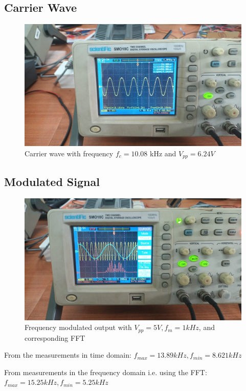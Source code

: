 \documentclass{article}
\begin{document}
\subsection{Carrier Wave}
\begin{figure}[!ht]
\includegraphics[width=\textwidth]{Carrier_10.08kHz.jpeg}
\caption{Carrier wave with frequency $f_c=10.08$ kHz and $V_{pp}=6.24V$}
\label{fig:carrier}
\end{figure}
\clearpage
\subsection{Modulated Signal}
\begin{figure}[!hbt]
\includegraphics[width=\textwidth]{FM_mt_FFT.jpeg}
\caption{Frequency modulated output with $V_{pp}=5V, f_m=1kHz$, and corresponding FFT}
\label{fig:fm_mt_FFT}
\end{figure}
From the measurements in time domain:
$f_{max}=13.89kHz, f_{min}=8.621kHz$

From measurements in the frequency domain i.e. using the FFT:
$f_{max}=15.25kHz, f_{min}=5.25kHz$
\end{document}
